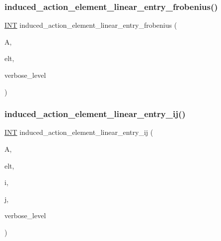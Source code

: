\subsubsection{\texorpdfstring{induced\+\_\+action\+\_\+element\+\_\+linear\+\_\+entry\+\_\+frobenius()}{induced\_action\_element\_linear\_entry\_frobenius()}}
{\footnotesize\ttfamily \mbox{\hyperlink{galois_8h_a09fddde158a3a20bd2dcadb609de11dc}{I\+NT}} induced\+\_\+action\+\_\+element\+\_\+linear\+\_\+entry\+\_\+frobenius (\begin{DoxyParamCaption}\item[{\mbox{\hyperlink{classaction}{action}} \&}]{A,  }\item[{void $\ast$}]{elt,  }\item[{\mbox{\hyperlink{galois_8h_a09fddde158a3a20bd2dcadb609de11dc}{I\+NT}}}]{verbose\+\_\+level }\end{DoxyParamCaption})}

\mbox{\label{interface_8_c_a47c7bc13ff83642f146b13216a9755a0}} 
\subsubsection{\texorpdfstring{induced\+\_\+action\+\_\+element\+\_\+linear\+\_\+entry\+\_\+ij()}{induced\_action\_element\_linear\_entry\_ij()}}
{\footnotesize\ttfamily \mbox{\hyperlink{galois_8h_a09fddde158a3a20bd2dcadb609de11dc}{I\+NT}} induced\+\_\+action\+\_\+element\+\_\+linear\+\_\+entry\+\_\+ij (\begin{DoxyParamCaption}\item[{\mbox{\hyperlink{classaction}{action}} \&}]{A,  }\item[{void $\ast$}]{elt,  }\item[{\mbox{\hyperlink{galois_8h_a09fddde158a3a20bd2dcadb609de11dc}{I\+NT}}}]{i,  }\item[{\mbox{\hyperlink{galois_8h_a09fddde158a3a20bd2dcadb609de11dc}{I\+NT}}}]{j,  }\item[{\mbox{\hyperlink{galois_8h_a09fddde158a3a20bd2dcadb609de11dc}{I\+NT}}}]{verbose\+\_\+level }\end{DoxyParamCaption})}

